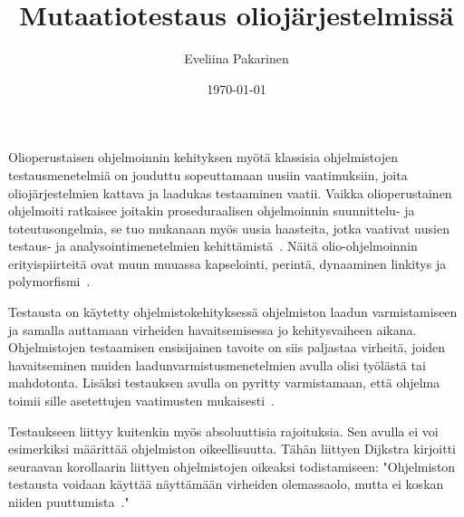 \documentclass[finnish]{tktltiki2}
\title{Mutaatiotestaus oliojärjestelmissä}
\author{Eveliina Pakarinen}
\date{\today}
\theoremstyle{definition}
\theoremstyle{remark}
\begin{document}

\frontmatter      %

\maketitle        %



\mainmatter       %




Olioperustaisen ohjelmoinnin kehityksen myötä klassisia ohjelmistojen testausmenetelmiä on jouduttu sopeuttamaan uusiin vaatimuksiin, joita oliojärjestelmien kattava ja laadukas testaaminen vaatii. Vaikka olioperustainen ohjelmoiti ratkaisee joitakin proseduraalisen ohjelmoinnin suunnittelu- ja toteutusongelmia, se tuo mukanaan myös uusia haasteita, jotka vaativat uusien testaus- ja analysointimenetelmien kehittämistä~\cite{Mariani:Pezze:2008}. Näitä olio-ohjelmoinnin erityispiirteitä ovat muun muuassa kapselointi, perintä, dynaaminen linkitys ja polymorfismi~\cite{jokulähde}. 

Testausta on käytetty ohjelmistokehityksessä ohjelmiston laadun varmistamiseen ja samalla auttamaan virheiden havaitsemisessa jo kehitysvaiheen aikana. Ohjelmistojen testaamisen ensisijainen tavoite on siis paljastaa virheitä, joiden havaitseminen muiden laadunvarmistusmenetelmien avulla olisi työlästä tai mahdotonta. Lisäksi testauksen avulla on pyritty varmistamaan, että ohjelma toimii sille asetettujen vaatimusten mukaisesti~\cite[s. 59]{Binder:1999}. 

Testaukseen liittyy kuitenkin myös absoluuttisia rajoituksia. Sen avulla ei voi esimerkiksi määrittää ohjelmiston oikeellisuutta. Tähän liittyen Dijkstra kirjoitti seuraavan korollaarin liittyen ohjelmistojen oikeaksi todistamiseen: "Ohjelmiston testausta voidaan käyttää näyttämään virheiden olemassaolo, mutta ei koskan niiden puuttumista~\cite[s. 6]{Dahl:Dijkstra:Hoare:1972}." 
\end{document}
